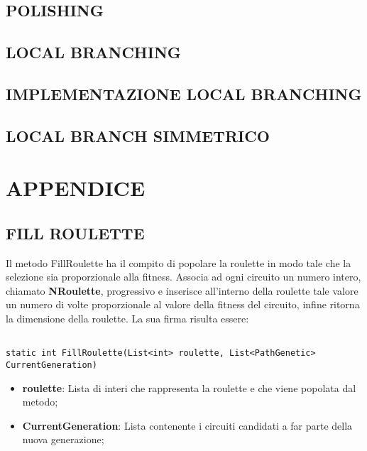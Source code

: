 \documentclass[11pt]{article}
\begin{document}
\subsection*{POLISHING}

\subsection*{LOCAL BRANCHING}

\subsection*{IMPLEMENTAZIONE LOCAL BRANCHING}

\subsection*{LOCAL BRANCH SIMMETRICO}

\section*{APPENDICE}

\subsection*{FILL ROULETTE}

Il metodo FillRoulette ha il compito di popolare la roulette in modo tale che la selezione sia proporzionale alla fitness. Associa ad ogni circuito un numero intero, chiamato \textbf{NRoulette}, progressivo e inserisce all'interno della roulette tale valore un numero di volte proporzionale al valore della fitness del circuito, infine ritorna la dimensione della roulette. La sua firma risulta essere:

\begin{lstlisting}

static int FillRoulette(List<int> roulette, List<PathGenetic> CurrentGeneration)

\end{lstlisting}

\begin{itemize}
    \item \textbf{roulette}: Lista di interi che rappresenta la roulette e che viene popolata dal metodo;
    \item \textbf{CurrentGeneration}: Lista contenente i circuiti candidati a far parte della nuova generazione;
\end{itemize}
\end{document}
